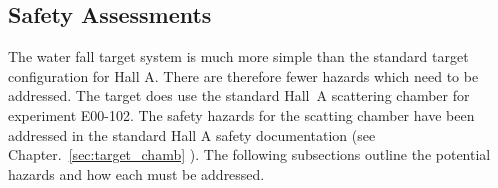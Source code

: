 \begin{safetyen}{0}{0}
\section{Safety Assessments}
\end{safetyen}

\begin{safetyen}{50}{50}
The water fall target system is much more simple than the standard
target configuration for Hall A. There are therefore fewer hazards
which need to be addressed. The target does use the standard Hall~A 
scattering chamber for experiment E00-102. The safety hazards for
the scatting chamber have been addressed in the standard Hall A safety
documentation (see Chapter.~\ref{sec:target_chamb}%
). 
The following subsections outline the potential hazards
and how each must be addressed.
\end{safetyen}

